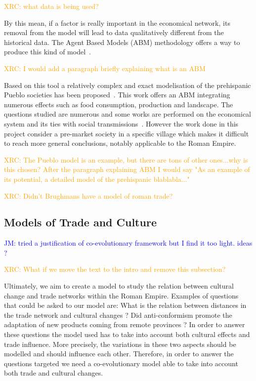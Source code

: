 \documentclass{wscpaperproc}
\newcommand{\memo}[2]{\textcolor{#1}{#2}}
\newcommand{\jm}[1]{\memo{blue}{JM: #1\\}}
\newcommand{\xrc}[1]{\memo{orange}{XRC: #1\\}}
\begin{document}
\xrc{what data is being used?}

By this mean, if a factor is really important in the economical network, its removal from the model will lead to data qualitatively different from the historical data. The Agent Based Models (ABM) methodology offers a way to produce this kind of model~\cite{lake_trends_2014}.

\xrc{I would add a paragraph briefly explaining what is an ABM}

Based on this tool a relatively complex and exact modelisation of the prehispanic Pueblo societies has been proposed~\cite{kohler_modelling_2012}. This work offers an ABM integrating numerous effects such as food consumption, production and landscape. The questions studied are  numerous and some works are performed on the economical system and its ties with social transmissions~\cite{kobti_emergence_2006,cockburn_simulating_2013}. However the work done in this project consider a pre-market society in a specific village which makes it difficult to reach more general conclusions, notably applicable to the Roman Empire.

\xrc{The Pueblo model is an example, but there are tons of other ones...why is this chosen? After the paragraph explaining ABM I would say "As an example of its potential, a detailed model of the prehispanic blablabla..."}

\xrc{Didn't Brughmans have a model of roman trade?}


\subsection{Models of Trade and Culture}

\jm{tried a justification of co-evolutionary framework but I find it too light. ideas ?}

\xrc{What if we move the text to the intro and remove this subsection?}

Ultimately, we aim to create a model to study the relation between cultural change and trade networks within the Roman Empire. Examples of questions that could be asked to our model are: What is the relation between distances in the trade network and cultural changes ? Did anti-conformism promote the adaptation of new products coming from remote provinces ? In order to answer these questions the model used has to take into account both cultural effects and trade influence. More precisely, the variations in these two aspects should be modelled and should influence each other.  Therefore, in order to answer the questions targeted we need a co-evolutionary model able to take into account both trade and cultural changes. 
\end{document}
